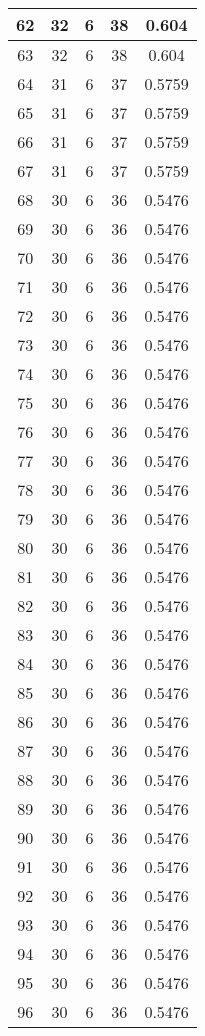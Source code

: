 \documentclass[letterpaper, 12pt]{article}
\begin{document}
\begin{longtable}{|c|c|c|c|c|}
\hline
62 & 32 & 6 & 38 & 0.604 \\
\hline
63 & 32 & 6 & 38 & 0.604 \\
\hline
64 & 31 & 6 & 37 & 0.5759 \\
\hline
65 & 31 & 6 & 37 & 0.5759 \\
\hline
66 & 31 & 6 & 37 & 0.5759 \\
\hline
67 & 31 & 6 & 37 & 0.5759 \\
\hline
68 & 30 & 6 & 36 & 0.5476 \\
\hline
69 & 30 & 6 & 36 & 0.5476 \\
\hline
70 & 30 & 6 & 36 & 0.5476 \\
\hline
71 & 30 & 6 & 36 & 0.5476 \\
\hline
72 & 30 & 6 & 36 & 0.5476 \\
\hline
73 & 30 & 6 & 36 & 0.5476 \\
\hline
74 & 30 & 6 & 36 & 0.5476 \\
\hline
75 & 30 & 6 & 36 & 0.5476 \\
\hline
76 & 30 & 6 & 36 & 0.5476 \\
\hline
77 & 30 & 6 & 36 & 0.5476 \\
\hline
78 & 30 & 6 & 36 & 0.5476 \\
\hline
79 & 30 & 6 & 36 & 0.5476 \\
\hline
80 & 30 & 6 & 36 & 0.5476 \\
\hline
81 & 30 & 6 & 36 & 0.5476 \\
\hline
82 & 30 & 6 & 36 & 0.5476 \\
\hline
83 & 30 & 6 & 36 & 0.5476 \\
\hline
84 & 30 & 6 & 36 & 0.5476 \\
\hline
85 & 30 & 6 & 36 & 0.5476 \\
\hline
86 & 30 & 6 & 36 & 0.5476 \\
\hline
87 & 30 & 6 & 36 & 0.5476 \\
\hline
88 & 30 & 6 & 36 & 0.5476 \\
\hline
89 & 30 & 6 & 36 & 0.5476 \\
\hline
90 & 30 & 6 & 36 & 0.5476 \\
\hline
91 & 30 & 6 & 36 & 0.5476 \\
\hline
92 & 30 & 6 & 36 & 0.5476 \\
\hline
93 & 30 & 6 & 36 & 0.5476 \\
\hline
94 & 30 & 6 & 36 & 0.5476 \\
\hline
95 & 30 & 6 & 36 & 0.5476 \\
\hline
96 & 30 & 6 & 36 & 0.5476 \\

\end{longtable}
\end{document}

